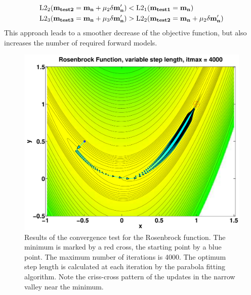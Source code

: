 \begin{equation}
\begin{split}
&\rm{L2_2(\mathbf{m_{test2}} = \mathbf{m_{n}} + \mu_2 \delta \mathbf{m'_n}) < L2_1(\mathbf{m_{test1}} = \mathbf{m_{n}})}\\
&\rm{L2_3(\mathbf{m_{test3}} = \mathbf{m_{n}} + \mu_3 \delta \mathbf{m'_n}) > L2_2(\mathbf{m_{test2}} = \mathbf{m_{n}} + \mu_2 \delta \mathbf{m'_n})}\\
\end{split}
\label{parabola1:1:100}
\end{equation}              
This approach leads to a smoother decrease of the objective function, but also increases the number of required forward models.         
\begin{figure}[ht]
\begin{center}
\includegraphics[width=16cm]{figures/Rosenbrock_3}
\caption{Results of the convergence test for the Rosenbrock function. The minimum is marked by a red cross, the starting point by a blue point. The maximum number of iterations is 4000. The optimum step length is calculated at each iteration by the parabola fitting algorithm. Note the criss-cross pattern of the updates in the narrow valley near the minimum.}
\label{Rosenbrock_variable}
\end{center}
\end{figure}
